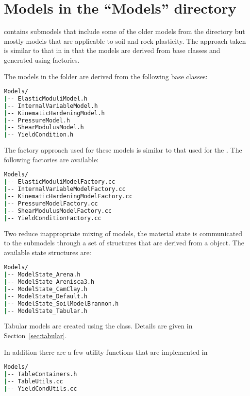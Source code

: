 \section{Models in the ``Models'' directory}
 contains submodels that include some of the older models from
the  directory but mostly models that are applicable
to soil and rock plasticity. The approach taken is similar to that in
 in that the models are derived from base classes
and generated using factories.  

The models in the  folder are derived from the 
following base classes:
\begin{lstlisting}[language=sh, backgroundcolor=\color{background}]
Models/
|-- ElasticModuliModel.h
|-- InternalVariableModel.h
|-- KinematicHardeningModel.h
|-- PressureModel.h
|-- ShearModulusModel.h
|-- YieldCondition.h
\end{lstlisting}

The factory approach used for these models is similar to that used for 
the .  The following factories are available:
\begin{lstlisting}[language=sh, backgroundcolor=\color{background}]
Models/
|-- ElasticModuliModelFactory.cc
|-- InternalVariableModelFactory.cc
|-- KinematicHardeningModelFactory.cc
|-- PressureModelFactory.cc
|-- ShearModulusModelFactory.cc
|-- YieldConditionFactory.cc
\end{lstlisting}

Two reduce inappropriate mixing of models, the material state is communicated 
to the submodels through a set of structures that are derived from a
 object.  The available state structures are:
\begin{lstlisting}[language=sh, backgroundcolor=\color{background}]
Models/
|-- ModelState_Arena.h
|-- ModelState_Arenisca3.h
|-- ModelState_CamClay.h
|-- ModelState_Default.h
|-- ModelState_SoilModelBrannon.h
|-- ModelState_Tabular.h
\end{lstlisting}

Tabular models are created using the  class.  Details
are given in Section~\ref{sec:tabular}.

In addition there are a few utility functions that are implemented in
\begin{lstlisting}[language=sh, backgroundcolor=\color{background}]
Models/
|-- TableContainers.h
|-- TableUtils.cc
|-- YieldCondUtils.cc
\end{lstlisting}

